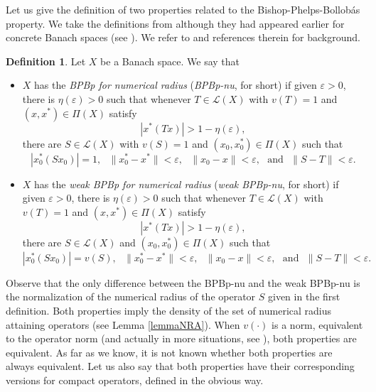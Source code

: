 \documentclass[10pt,a4paper]{amsart}
\theoremstyle{plain}
\theoremstyle{definition}
\newtheorem{definition}[theorem]{Definition}
\newcommand{\eps}{\varepsilon}
\begin{document}
Let us give the definition of two properties related to the Bishop-Phelps-Bollob\'{a}s property. We take the definitions from \cite{KLM1} although they had appeared earlier for concrete Banach spaces (see \cite{GK}). We refer to \cite{AcoFakSole,AGR,GK, KLM1,KLM} and references therein for background.

\begin{definition} \label{defBPBp-nu}
Let $X$ be a Banach space. We say that
\begin{itemize}
\item[(a)] $X$ has the \emph{BPBp for numerical radius} (\emph{BPBp-nu}, for short) if given $\eps>0$, there is $\eta(\eps) > 0$ such that whenever $T \in \mathcal{L}(X)$ with $v(T) = 1$ and $(x, x^*) \in \Pi(X)$ satisfy
\begin{equation*}
|x^*(Tx)| > 1 - \eta(\eps),
\end{equation*}
there are $S \in \mathcal{L}(X)$ with $v(S) = 1$ and $(x_0, x_0^*) \in \Pi(X)$ such that
\begin{equation*}
|x_0^*(Sx_0)| = 1, \ \ \ \|x_0^*-x^*\| < \eps, \ \ \ \|x_0 - x\| < \eps, \ \ \ \text{and} \ \ \ \|S - T\| < \eps.
\end{equation*}
\item[(b)] $X$ has the {\it weak BPBp for numerical radius} (\emph{weak BPBp-nu}, for short) if given $\eps>0$, there is $\eta(\eps) > 0$ such that whenever $T \in \mathcal{L}(X)$ with $v(T) = 1$ and $(x, x^*) \in \Pi(X)$ satisfy
\begin{equation*}
|x^*(Tx)| > 1 - \eta(\eps),
\end{equation*}
there are $S \in \mathcal{L}(X)$ and $(x_0, x_0^*) \in \Pi(X)$ such that
\begin{equation*}
|x_0^*(Sx_0)| = v(S), \ \ \ \|x_0^*-x^*\| < \eps, \ \ \ \|x_0 - x\| < \eps, \ \ \ \text{and} \ \ \ \|S - T\| < \eps.
\end{equation*}
\end{itemize}
\end{definition}

Observe that the only difference between the BPBp-nu and the weak BPBp-nu is the normalization of the numerical radius of the operator $S$ given in the first definition. Both properties imply the density of the set of numerical radius attaining operators (see Lemma \ref{lemmaNRA}). When $v(\cdot)$ is a norm, equivalent to the operator norm (and actually in more situations, see \cite{KLM1, KLM2}), both properties are equivalent. As far as we know, it is not known whether both properties are always equivalent. Let us also say that both properties have their corresponding versions for compact operators, defined in the obvious way.
\end{document}
